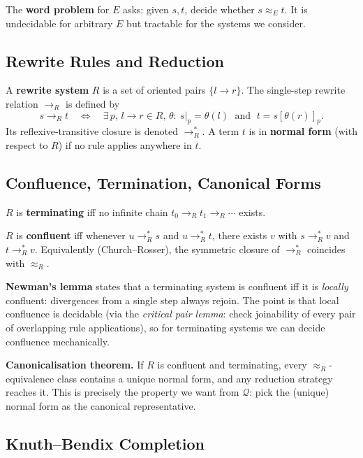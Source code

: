 \documentclass[11pt,a4paper]{article}
\begin{document}
The \textbf{word problem} for $E$ asks: given $s, t$, decide whether $s \approx_E t$. It is undecidable for arbitrary $E$ but tractable for the systems we consider.

\subsection{Rewrite Rules and Reduction}\label{sec:rewrite-rules}

A \textbf{rewrite system} $R$ is a set of oriented pairs $\{l \to r\}$. The single-step rewrite relation $\to_R$ is defined by
\[
  s \to_R t
  \quad\Longleftrightarrow\quad
  \exists\, p,\, l \to r \in R,\, \theta:\
  s|_p = \theta(l) \;\text{ and }\; t = s[\theta(r)]_p.
\]
Its reflexive-transitive closure is denoted $\to_R^*$. A term $t$ is in \textbf{normal form} (with respect to $R$) if no rule applies anywhere in $t$.

\subsection{Confluence, Termination, Canonical Forms}\label{sec:confluence}

$R$ is \textbf{terminating} iff no infinite chain $t_0 \to_R t_1 \to_R \cdots$ exists.

$R$ is \textbf{confluent} iff whenever $u \to_R^* s$ and $u \to_R^* t$, there exists $v$ with $s \to_R^* v$ and $t \to_R^* v$. Equivalently (Church--Rosser), the symmetric closure of $\to_R^*$ coincides with $\approx_R$.

\textbf{Newman's lemma} states that a terminating system is confluent iff it is \emph{locally} confluent: divergences from a single step always rejoin. The point is that local confluence is decidable (via the \emph{critical pair lemma}: check joinability of every pair of overlapping rule applications), so for terminating systems we can decide confluence mechanically.

\textbf{Canonicalisation theorem.} If $R$ is confluent and terminating, every $\approx_R$-equivalence class contains a unique normal form, and any reduction strategy reaches it. This is precisely the property we want from $\mathcal{Q}$: pick the (unique) normal form as the canonical representative.

\subsection{Knuth--Bendix Completion}\label{sec:kb}
\end{document}
